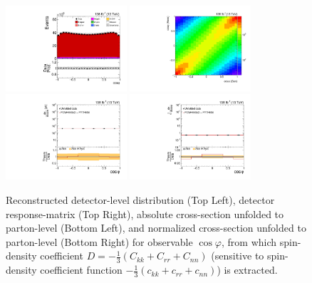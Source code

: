 \clearpage
\begin{figure}[htb]
\begin{center}
 \includegraphics[width=0.40\textwidth]{fig_fullRun2UL/controlplots/combined/Hyp_LLBarcHel.pdf}
 \includegraphics[width=0.40\textwidth]{fig_fullRun2UL/unfolding/combined/ResponseMatrix_ll_cHel.pdf} \\
 \includegraphics[width=0.40\textwidth]{fig_fullRun2UL/unfolding/combined/UnfoldedResults_ll_cHel.pdf}
 \includegraphics[width=0.40\textwidth]{fig_fullRun2UL/unfolding/combined/UnfoldedResultsNorm_ll_cHel.pdf} \\
\label{fig:ll_cHel}
\caption{Reconstructed detector-level distribution (Top Left), detector response-matrix (Top Right), absolute cross-section unfolded to parton-level (Bottom Left), and normalized cross-section unfolded to parton-level (Bottom Right) for  observable $\cos\varphi$, from which spin-density coefficient $D = -\frac{1}{3}(C_{kk} + C_{rr} + C_{nn})$ (sensitive to spin-density coefficient function $-\frac{1}{3}(c_{kk} + c_{rr} + c_{nn})$) is extracted.}
\end{center}
\end{figure}
